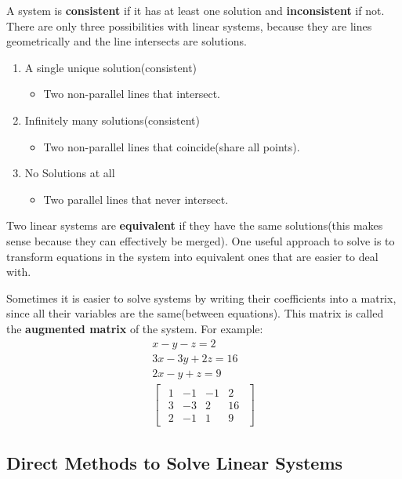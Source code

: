 \documentclass{article}
\begin{document}
A system is \textbf{consistent} if it has at least one solution and \textbf{inconsistent} if not. There are only three possibilities with linear systems, because they are lines geometrically and the line intersects are solutions.
\begin{enumerate}
    \item A single unique solution(consistent)
    \begin{itemize}
        \item Two non-parallel lines that intersect.
    \end{itemize}
    \item Infinitely many solutions(consistent)
    \begin{itemize}
        \item Two non-parallel lines that coincide(share all points).
    \end{itemize}
    \item No Solutions at all
    \begin{itemize}
        \item Two parallel lines that never intersect.
    \end{itemize}
\end{enumerate}
Two linear systems are \textbf{equivalent} if they have the same solutions(this makes sense because they can effectively be merged). One useful approach to solve is to transform equations in the system into equivalent ones that are easier to deal with.

Sometimes it is easier to solve systems by writing their coefficients into a matrix, since all their variables are the same(between equations). This matrix is called the \textbf{augmented matrix} of the system. For example:
\begin{gather*}
    x - y - z = 2\\
    3x - 3y + 2z = 16\\
    2x - y + z = 9\\
    \begin{bmatrix}
    \begin{array}{ccc|c}
    1 & -1 & -1 &2 \\
    3 & -3 & 2 & 16\\
    2 & -1 & 1 & 9
    \end{array}
    \end{bmatrix}
\end{gather*}
\subsection{Direct Methods to Solve Linear Systems}
\end{document}
